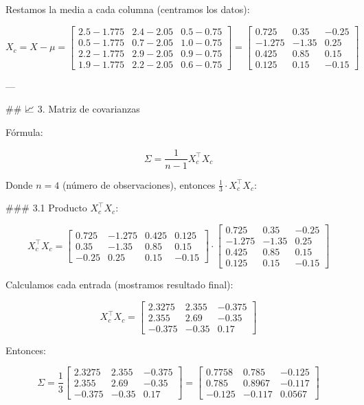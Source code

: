 \documentclass[12pt]{article} %
\begin{document}
Restamos la media a cada columna (centramos los datos):

\[
X_c = X - \mu =
\begin{bmatrix}
2.5 - 1.775 & 2.4 - 2.05 & 0.5 - 0.75 \\
0.5 - 1.775 & 0.7 - 2.05 & 1.0 - 0.75 \\
2.2 - 1.775 & 2.9 - 2.05 & 0.9 - 0.75 \\
1.9 - 1.775 & 2.2 - 2.05 & 0.6 - 0.75
\end{bmatrix}
=
\begin{bmatrix}
0.725 & 0.35  & -0.25 \\
-1.275 & -1.35 & 0.25 \\
0.425 & 0.85  & 0.15 \\
0.125 & 0.15  & -0.15
\end{bmatrix}
\]

---

## 📈 3. Matriz de covarianzas

Fórmula:

\[
\Sigma = \frac{1}{n-1} X_c^\top X_c
\]

Donde \( n = 4 \) (número de observaciones), entonces \( \frac{1}{3} \cdot X_c^\top X_c \):

### 3.1 Producto \( X_c^\top X_c \):

\[
X_c^\top X_c =
\begin{bmatrix}
0.725 & -1.275 & 0.425 & 0.125 \\
0.35  & -1.35  & 0.85  & 0.15 \\
-0.25 & 0.25   & 0.15  & -0.15
\end{bmatrix}
\cdot
\begin{bmatrix}
0.725 & 0.35  & -0.25 \\
-1.275 & -1.35 & 0.25 \\
0.425 & 0.85  & 0.15 \\
0.125 & 0.15  & -0.15
\end{bmatrix}
\]

Calculamos cada entrada (mostramos resultado final):

\[
X_c^\top X_c =
\begin{bmatrix}
2.3275 & 2.355 & -0.375 \\
2.355  & 2.69  & -0.35 \\
-0.375 & -0.35 & 0.17
\end{bmatrix}
\]

Entonces:

\[
\Sigma = \frac{1}{3}
\begin{bmatrix}
2.3275 & 2.355 & -0.375 \\
2.355  & 2.69  & -0.35 \\
-0.375 & -0.35 & 0.17
\end{bmatrix}
=
\begin{bmatrix}
0.7758 & 0.785 & -0.125 \\
0.785  & 0.8967 & -0.117 \\
-0.125 & -0.117 & 0.0567
\end{bmatrix}
\]
\end{document}
